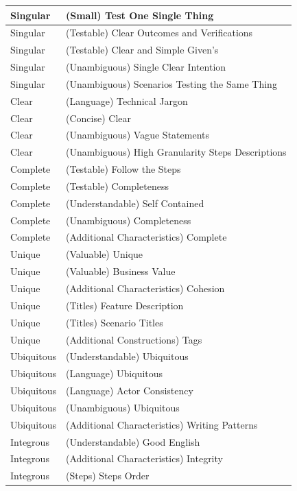 \begin{table}[t!]
\begin{tabular}{|m{2cm}|m{10cm}|}
        \hline
        Singular & (Small) Test One Single Thing\\
        \hline
        Singular & (Testable) Clear Outcomes and Verifications\\
        \hline
        Singular & (Testable) Clear and Simple Given's\\
        \hline
        Singular & (Unambiguous) Single Clear Intention\\
        \hline
        Singular & (Unambiguous) Scenarios Testing the Same Thing\\
        \hline
        Clear & (Language) Technical Jargon\\
        \hline
        Clear & (Concise) Clear\\
        \hline
        Clear & (Unambiguous) Vague Statements\\
        \hline
        Clear & (Unambiguous) High Granularity Steps Descriptions\\
        \hline
        Complete & (Testable) Follow the Steps\\
        \hline
        Complete & (Testable) Completeness\\
        \hline
        Complete & (Understandable) Self Contained\\
        \hline
        Complete & (Unambiguous) Completeness\\
        \hline
        Complete & (Additional Characteristics) Complete\\
        \hline
        Unique & (Valuable) Unique\\
        \hline
        Unique & (Valuable) Business Value\\
        \hline
        Unique & (Additional Characteristics) Cohesion\\
        \hline
        Unique & (Titles) Feature Description\\
        \hline
        Unique & (Titles) Scenario Titles\\
        \hline
        Unique & (Additional Constructions) Tags\\
        \hline
        Ubiquitous & (Understandable) Ubiquitous\\
        \hline
        Ubiquitous & (Language) Ubiquitous\\
        \hline
        Ubiquitous & (Language) Actor Consistency\\
        \hline
        Ubiquitous & (Unambiguous) Ubiquitous\\
        \hline
        Ubiquitous & (Additional Characteristics) Writing Patterns\\
        \hline
        Integrous & (Understandable) Good English\\
        \hline
        Integrous & (Additional Characteristics) Integrity\\
        \hline
        Integrous & (Steps) Steps Order \\
        \hline
    \end{tabular}
\end{table}
\clearpage





